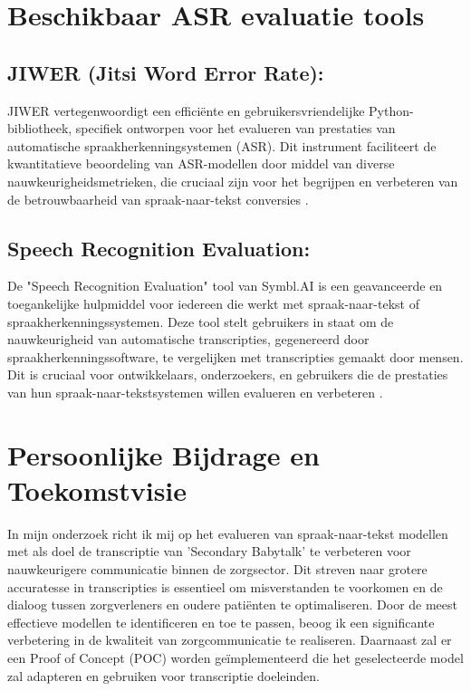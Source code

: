 
\section{Beschikbaar ASR evaluatie tools}
\subsection{JIWER (Jitsi Word Error Rate):} JIWER vertegenwoordigt een efficiënte en gebruikersvriendelijke Python-bibliotheek, specifiek ontworpen voor het evalueren van prestaties van automatische spraakherkenningsystemen (ASR). Dit instrument faciliteert de kwantitatieve beoordeling van ASR-modellen door middel van diverse nauwkeurigheidsmetrieken, die cruciaal zijn voor het begrijpen en verbeteren van de betrouwbaarheid van spraak-naar-tekst conversies \autocite{jiwer2023}.

\subsection{Speech Recognition Evaluation:} De "Speech Recognition Evaluation" tool van Symbl.AI is een geavanceerde en toegankelijke hulpmiddel voor iedereen die werkt met spraak-naar-tekst of spraakherkenningssystemen. Deze tool stelt gebruikers in staat om de nauwkeurigheid van automatische transcripties, gegenereerd door spraakherkenningssoftware, te vergelijken met transcripties gemaakt door mensen. Dit is cruciaal voor ontwikkelaars, onderzoekers, en gebruikers die de prestaties van hun spraak-naar-tekstsystemen willen evalueren en verbeteren \autocite{speechrecognitionevaluation2021}.

\section{Persoonlijke Bijdrage en Toekomstvisie}

In mijn onderzoek richt ik mij op het evalueren van spraak-naar-tekst modellen met als doel de transcriptie van 'Secondary Babytalk' te verbeteren voor nauwkeurigere communicatie binnen de zorgsector. Dit streven naar grotere accuratesse in transcripties is essentieel om misverstanden te voorkomen en de dialoog tussen zorgverleners en oudere patiënten te optimaliseren. Door de meest effectieve modellen te identificeren en toe te passen, beoog ik een significante verbetering in de kwaliteit van zorgcommunicatie te realiseren. Daarnaast zal er een Proof of Concept (POC) worden geïmplementeerd die het geselecteerde model zal adapteren en gebruiken voor transcriptie doeleinden.


